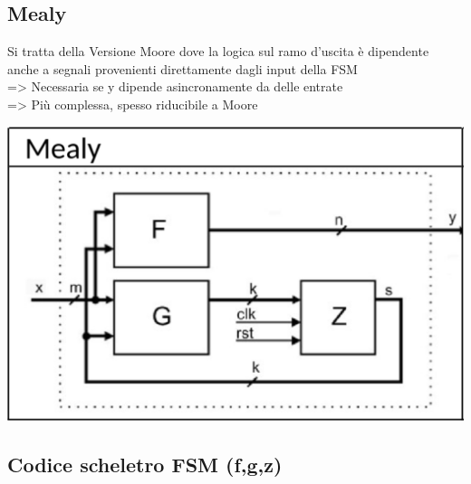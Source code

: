     \subsection{Mealy}
    \begin{minipage}[t]{0.48\columnwidth}
        \vspace{0pt} %
        Si tratta della Versione Moore dove la logica sul ramo d'uscita è dipendente anche a segnali provenienti direttamente
        dagli input della FSM\\
        => Necessaria se y dipende asincronamente da delle entrate\\
        => Più complessa, spesso riducibile a Moore
    \end{minipage}%
    \hfill
    \begin{minipage}[t]{0.48\columnwidth}
        \vspace{0pt} %
        \includegraphics[width=\linewidth]{Images/Mealy.png}
    \end{minipage}


    \subsection{Codice scheletro FSM (f,g,z)}


